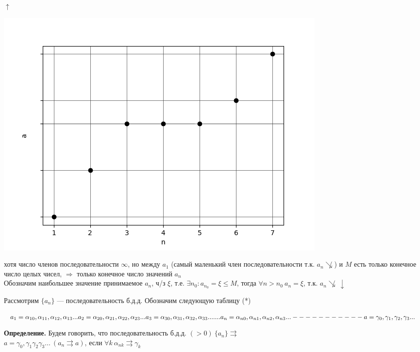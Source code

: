 \documentclass{article}
\begin{document}
    \(\uparrow\)

    \includegraphics[scale=0.6]{8}
    
    хотя число членов последовательности \(\infty\), но между \(a_1\) (самый маленький член последовательности т.к. \( a_n \not\searrow \)) и \(M\) есть только конечное число целых чисел, \(\Rightarrow\) только конечное число значений \(a_n\)\\
    Обозначим наибольшее значение принимаемое \( a_n \), ч/з \( \xi \), т.е. \( \exists n_0: a_{n_0} = \xi \leq M \), тогда \( \forall n > n_0\ a_n = \xi \), т.к. \( a_n \not \searrow\ \downarrow \)
    
    Рассмотрим $\{a_n\}$ --- последовательность б.д.д. Обозначим следующую таблицу (*)

    \(
      a_1 = \alpha_{10},\alpha_{11},\alpha_{12},\alpha_{13}...\\
      a_2 = \alpha_{20},\alpha_{21},\alpha_{22},\alpha_{23}...\\
      a_3 = \alpha_{30},\alpha_{31},\alpha_{32},\alpha_{33}...\\
      .\\
      .\\
      .\\
      .\\
      a_n = \alpha_{n0},\alpha_{n1},\alpha_{n2},\alpha_{n3}...\\
      -----------\\
      a = \gamma_{0},\gamma_{1},\gamma_{2},\gamma_{3}...
    \)

    \textbf{Определение.} Будем говорить, что последовательность б.д.д. \( (>0)\ \{a_n\} \rightrightarrows \)\\
    \( a = \gamma_0,\gamma_1\gamma_2\gamma_3...\ (a_n \rightrightarrows a) \), если \(\forall k \ \alpha_{nk} \rightrightarrows \gamma_k\)
\end{document}
